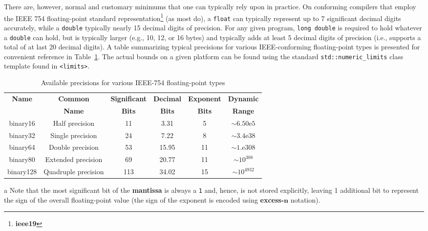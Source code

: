 There are, however, normal and customary minimums that one can typically
rely upon in practice. On conforming compilers that employ the IEEE 754
floating-point standard representation\footnote{\textbf{ieee19}} (as most do),
a \texttt{float} can typically represent up to 7 significant decimal
digits accurately, while a \texttt{double} typically nearly 15 decimal
digits of precision. For any given program,
\texttt{long}~\texttt{double} is required to hold whatever a
\texttt{double} can hold, but is typically larger (e.g., 10, 12, or 16
bytes) and typically adds at least 5 decimal digits of precision (i.e.,
supports a total of at last 20 decimal digits). A table summarizing
typical precisions for various IEEE-conforming floating-point types is
presented for convenient reference in Table~\ref{digitseparator-table3}. The actual bounds on a
given platform can be found using the standard
\texttt{std::numeric\_limits} class template found in \texttt{<limits>}.\pagebreak[4]
\begin{table}[h!]
\begin{center}
\begin{threeparttable}
\caption{Available precisions for various IEEE-754 floating-point types}\label{digitseparator-table3}\vspace{1.5ex}
{\small \begin{tabular}{c|c|c|c|c|c}\thickhline
\rowcolor[gray]{.9}   {\sffamily\bfseries Name} & {\sffamily\bfseries Common} &
{\sffamily\bfseries Significant } & {\sffamily\bfseries Decimal }& {\sffamily\bfseries Exponent } & {\sffamily\bfseries Dynamic}\\
\rowcolor[gray]{.9}    & {\sffamily\bfseries Name} &
{\sffamily\bfseries Bits\tnote{a}} & {\sffamily\bfseries Bits}& {\sffamily\bfseries Bits} & {\sffamily\bfseries Range}\\ \hline
binary16 & Half precision & 11 & 3.31 & 5 & $\sim6.50\text{e}5$\\ \hline
binary32 & Single precision & 24 & 7.22 & 8 & $\sim3.4\text{e}38$\\ \hline
binary64 & Double precision & 53 & 15.95 & 11 & $\sim1.\text{e}308$\\ \hline
\rule{0pt}{3.5mm}binary80 & Extended precision & 69 & 20.77 & 11 & $\sim10^{308}$\\ \hline
\rule{0pt}{3.5mm}binary128 & Quadruple precision & 113 & 34.02 & 15 & $\sim10^{4932}$\\ \hline
\end{tabular}
} %
\begin{tablenotes}{\footnotesize
\item[a]{Note that the most significant bit of the \textbf{mantissa}
is always a \texttt{1} and, hence, is not stored explicitly, leaving 1
additional bit to represent the sign of the overall floating-point value
(the sign of the exponent is encoded using \textbf{excess-$\mathbf{n}$}
notation).}
} %
\end{tablenotes} %
\end{threeparttable}
\end{center}
\end{table}

